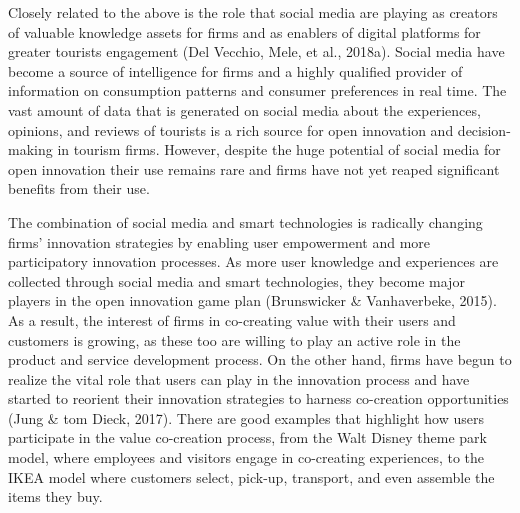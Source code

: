 \documentclass[
  letterpaper,
  DIV=11,
  numbers=noendperiod]{scrreprt}
\begin{document}
Closely related to the above is the role that social media are playing
as creators of valuable knowledge assets for firms and as enablers of
digital platforms for greater tourists engagement (Del Vecchio, Mele, et
al., 2018a). Social media have become a source of intelligence for firms
and a highly qualified provider of information on consumption patterns
and consumer preferences in real time. The vast amount of data that is
generated on social media about the experiences, opinions, and reviews
of tourists is a rich source for open innovation and decision-making in
tourism firms. However, despite the huge potential of social media for
open innovation their use remains rare and firms have not yet reaped
significant benefits from their use.

The combination of social media and smart technologies is radically
changing firms' innovation strategies by enabling user empowerment and
more participatory innovation processes. As more user knowledge and
experiences are collected through social media and smart technologies,
they become major players in the open innovation game plan (Brunswicker
\& Vanhaverbeke, 2015). As a result, the interest of firms in
co-creating value with their users and customers is growing, as these
too are willing to play an active role in the product and service
development process. On the other hand, firms have begun to realize the
vital role that users can play in the innovation process and have
started to reorient their innovation strategies to harness co-creation
opportunities (Jung \& tom Dieck, 2017). There are good examples that
highlight how users participate in the value co-creation process, from
the Walt Disney theme park model, where employees and visitors engage in
co-creating experiences, to the IKEA model where customers select,
pick-up, transport, and even assemble the items they buy.
\end{document}
